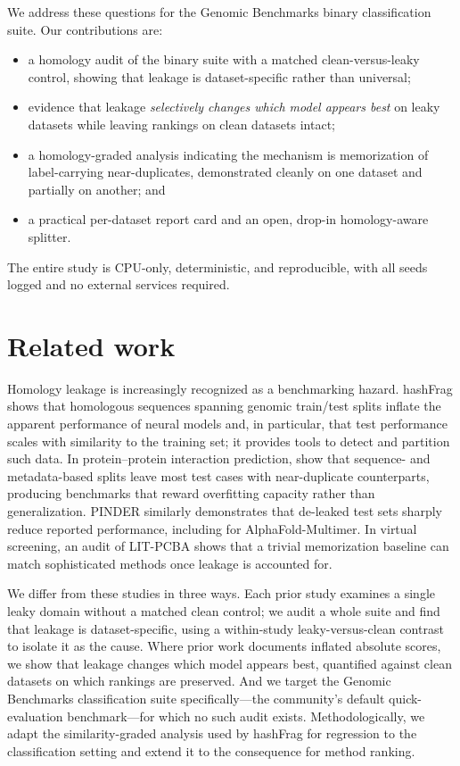 \documentclass[webpdf,modern,large,namedate]{oup-authoring-template}%
\begin{document}
We address these questions for the Genomic Benchmarks binary classification suite. Our contributions are:
\begin{itemize}
\item a homology audit of the binary suite with a matched clean-versus-leaky control, showing that leakage is dataset-specific rather than universal;
\item evidence that leakage \emph{selectively changes which model appears best} on leaky datasets while leaving rankings on clean datasets intact;
\item a homology-graded analysis indicating the mechanism is memorization of label-carrying near-duplicates, demonstrated cleanly on one dataset and partially on another; and
\item a practical per-dataset report card and an open, drop-in homology-aware splitter.
\end{itemize}
The entire study is CPU-only, deterministic, and reproducible, with all seeds logged and no external services required.

\section{Related work}\label{sec:related}

Homology leakage is increasingly recognized as a benchmarking hazard. hashFrag \citep{rafi2025} shows that homologous sequences spanning genomic train/test splits inflate the apparent performance of neural models and, in particular, that test performance scales with similarity to the training set; it provides tools to detect and partition such data. In protein--protein interaction prediction, \citet{bushuiev2024} show that sequence- and metadata-based splits leave most test cases with near-duplicate counterparts, producing benchmarks that reward overfitting capacity rather than generalization. PINDER \citep{kovtun2024} similarly demonstrates that de-leaked test sets sharply reduce reported performance, including for AlphaFold-Multimer. In virtual screening, an audit of LIT-PCBA \citep{huang2025} shows that a trivial memorization baseline can match sophisticated methods once leakage is accounted for.

We differ from these studies in three ways. Each prior study examines a single leaky domain without a matched clean control; we audit a whole suite and find that leakage is dataset-specific, using a within-study leaky-versus-clean contrast to isolate it as the cause. Where prior work documents inflated absolute scores, we show that leakage changes which model appears best, quantified against clean datasets on which rankings are preserved. And we target the Genomic Benchmarks classification suite specifically---the community's default quick-evaluation benchmark---for which no such audit exists. Methodologically, we adapt the similarity-graded analysis used by hashFrag for regression to the classification setting and extend it to the consequence for method ranking.
\end{document}

